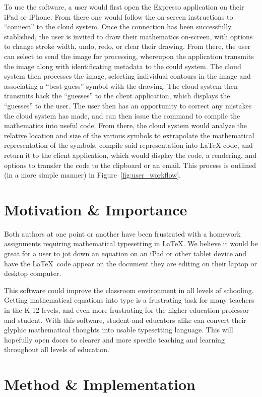 \documentclass{acm_proc_article-sp}
\begin{document}
To use the software, a user would first open the Expresso application on their iPad or iPhone. From there one would follow the on-screen instructions to ``connect'' to the cloud system. Once the connection has been successfully stablished, the user is invited to draw their mathematics on-screen, with options to change stroke width, undo, redo, or clear their drawing. From there, the user can select to send the image for processing, whereupon the application transmits the image along with identificating metadata to the could system. The cloud system then processes the image, selecting individual contours in the image and associating a ``best-guess'' symbol with the drawing. The cloud system then transmits back the ``guesses'' to the client application, which displays the ``guesses'' to the user. The user then has an opportunity to correct any mistakes the cloud system has made, and can then issue the command to compile the mathematics into useful code. From there, the cloud system would analyze the relative location and size of the various symbols to extrapolate the mathematical representation of the symbols, compile said representation into \LaTeX{} code, and return it to the client application, which would display the code, a rendering, and options to transfer the code to the clipboard or an email. This process is outlined (in a more simple manner) in Figure~\ref{fig:user_workflow}.

\section{Motivation \& Importance}
Both authors at one point or another have been frustrated with a homework assignments requiring mathematical typesetting in \LaTeX{}.  We believe it would be great for a user to jot down an equation on an iPad or other tablet device and have the \LaTeX{}\ code appear on the document they are editing on their laptop or desktop computer.

This software could improve the classroom environment in all levels of schooling. Getting mathematical equations into type is a frustrating task for many teachers in the K-12 levels, and even more frustrating for the higher-education professor and student. With this software, student and educators alike can convert their glyphic mathematical thoughts into usable typesetting language. This will hopefully open doors to clearer and more specific teaching and learning throughout all levels of education.

\section{Method \& Implementation}
\end{document}
